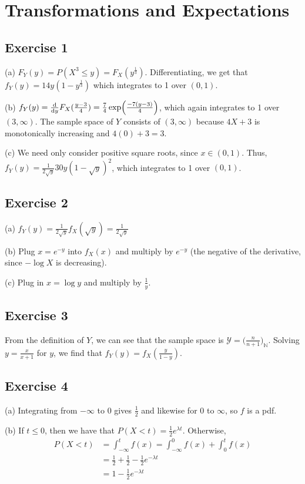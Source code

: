 \section{Transformations and Expectations}

\subsection{Exercise 1}
(a) $F_Y(y) = P(X^3 \leq y) = F_X (y^{\frac{1}{3}})$. Differentiating, we get that 
$f_Y(y) = 14y(1 - y^{\frac{1}{3}})$ which integrates to 1 over $(0, 1)$.

(b)  $f_Y(y) = \dv{y} F_X(\frac{y - 3}{4}) = \frac{7}{4} \exp(\frac{-7(y - 3)}{4})$, which again
integrates to 1 over $(3, \infty)$. The sample space of $Y$ consists of $(3, \infty)$ because 
$4X + 3$ is monotonically increasing and $4(0) + 3 = 3$.

(c) We need only consider positive square roots, since  $x \in (0, 1)$. Thus,
$f_Y(y) = \frac{1}{2\sqrt{y}}30y (1 - \sqrt{y})^2$, which integrates to 1 over $(0, 1)$.

\subsection{Exercise 2}
(a) $f_Y(y) = \frac{1}{2\sqrt{y}} f_X(\sqrt{y}) = \frac{1}{2\sqrt{y}}$

(b) Plug $x = e^{-y}$ into $f_X(x)$ and multiply by $e^{-y}$ (the negative of the derivative, since $-\log X$
is decreasing).

(c) Plug in  $x = \log y$ and multiply by $\frac{1}{y}$.

\subsection{Exercise 3}
From the definition of $Y$, we can see that the sample space is
$\mathcal{Y} = \big(\frac{n}{n+1}\big)_{\mathbb{N}}$. Solving $y = \frac{x}{x + 1}$ for $y$, we find that
$f_Y(y) = f_X(\frac{y}{1 - y})$.

\subsection{Exercise 4}
(a) Integrating from $-\infty$ to 0 gives $\frac{1}{2}$ and likewise for 0 to  $\infty$, so $f$ is a pdf.

(b) If $t \leq 0$, then we have that $P(X < t) = \frac{1}{2} e^{\lambda t}$. Otherwise, 
\begin{align*}
        P(X < t) &= \int_{-\infty}^{t} f(x) = \int_{-\infty}^{0} f(x) + \int_{0}^{t} f(x) \\ 
                 &= \frac{1}{2} + \frac{1}{2} - \frac{1}{2} e^{-\lambda t} \\
                 &= 1 - \frac{1}{2}e^{-\lambda t}
\end{align*}

